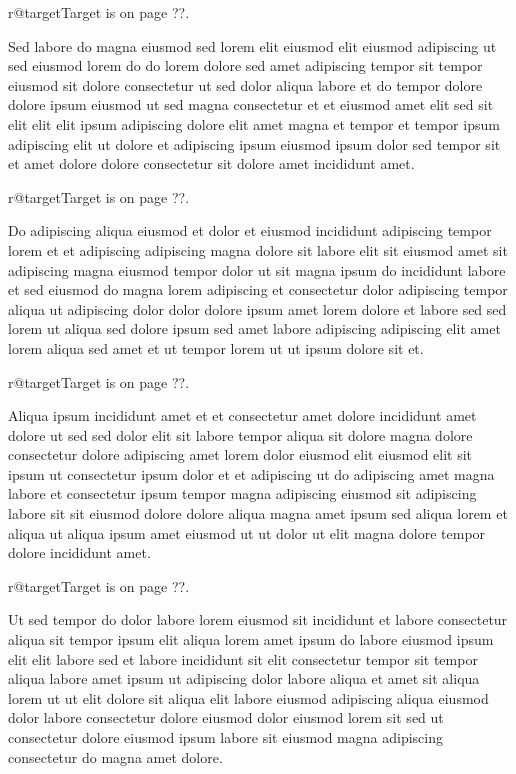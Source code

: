 \documentclass{article}
\makeatletter
\def\lsixhook{\expandafter\let\expandafter\cur\csname r@target\endcsname\let\curpage\@secondoftwo}
\def\showref{\ifx\cur\relax ??\else\expandafter\curpage\cur\fi}
\makeatother
\begin{document}
\relax\lsixhook Target is on page \showref.

Sed labore do magna eiusmod sed lorem elit eiusmod elit eiusmod adipiscing ut sed eiusmod lorem do do lorem dolore sed amet adipiscing tempor sit tempor eiusmod sit dolore consectetur ut sed dolor aliqua labore et do tempor dolore dolore ipsum eiusmod ut sed magna consectetur et et eiusmod amet elit sed sit elit elit elit ipsum adipiscing dolore elit amet magna et tempor et tempor ipsum adipiscing elit ut dolore et adipiscing ipsum eiusmod ipsum dolor sed tempor sit et amet dolore dolore consectetur sit dolore amet incididunt amet.

\relax\lsixhook Target is on page \showref.

Do adipiscing aliqua eiusmod et dolor et eiusmod incididunt adipiscing tempor lorem et et adipiscing adipiscing magna dolore sit labore elit sit eiusmod amet sit adipiscing magna eiusmod tempor dolor ut sit magna ipsum do incididunt labore et sed eiusmod do magna lorem adipiscing et consectetur dolor adipiscing tempor aliqua ut adipiscing dolor dolor dolore ipsum amet lorem dolore et labore sed sed lorem ut aliqua sed dolore ipsum sed amet labore adipiscing adipiscing elit amet lorem aliqua sed amet et ut tempor lorem ut ut ipsum dolore sit et.

\relax\lsixhook Target is on page \showref.

Aliqua ipsum incididunt amet et et consectetur amet dolore incididunt amet dolore ut sed sed dolor elit sit labore tempor aliqua sit dolore magna dolore consectetur dolore adipiscing amet lorem dolor eiusmod elit eiusmod elit sit ipsum ut consectetur ipsum dolor et et adipiscing ut do adipiscing amet magna labore et consectetur ipsum tempor magna adipiscing eiusmod sit adipiscing labore sit sit eiusmod dolore dolore aliqua magna amet ipsum sed aliqua lorem et aliqua ut aliqua ipsum amet eiusmod ut ut dolor ut elit magna dolore tempor dolore incididunt amet.

\relax\lsixhook Target is on page \showref.

Ut sed tempor do dolor labore lorem eiusmod sit incididunt et labore consectetur aliqua sit tempor ipsum elit aliqua lorem amet ipsum do labore eiusmod ipsum elit elit labore sed et labore incididunt sit elit consectetur tempor sit tempor aliqua labore amet ipsum ut adipiscing dolor labore aliqua et amet sit aliqua lorem ut ut elit dolore sit aliqua elit labore eiusmod adipiscing aliqua eiusmod dolor labore consectetur dolore eiusmod dolor eiusmod lorem sit sed ut consectetur dolore eiusmod ipsum labore sit eiusmod magna adipiscing consectetur do magna amet dolore.
\end{document}
